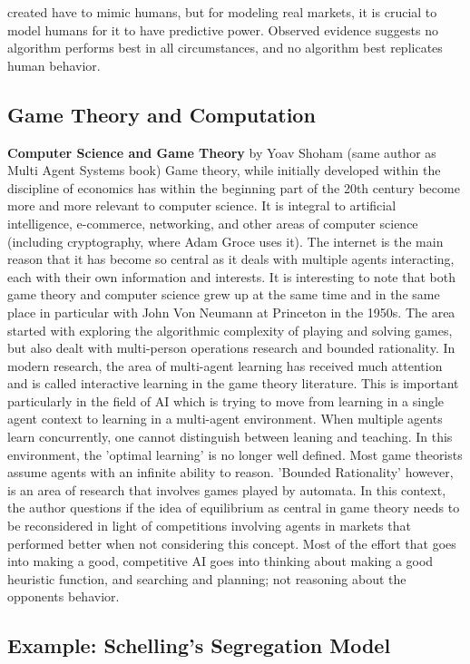 \documentclass[12pt,twoside]{reedthesis}
\begin{document}
created have to mimic humans, but for modeling real markets, it is crucial to model humans for it to have predictive power. Observed evidence suggests no algorithm performs best in all circumstances, and no algorithm best replicates human behavior. \cite{Tesfatsion2002}

\subsection{Game Theory and Computation}
\textbf{Computer Science and Game Theory} by Yoav Shoham (same author as Multi Agent Systems book) Game theory, while initially developed within the discipline of economics has within the beginning part of the 20th century become more and more relevant to computer science. It is integral to artificial intelligence, e-commerce, networking, and other areas of computer science (including cryptography, where Adam Groce uses it). The internet is the main reason that it has become so central as it deals with multiple agents interacting, each with their own information and interests. It is interesting to note that both game theory and computer science grew up at the same time and in the same place in particular with John Von Neumann at Princeton in the 1950s. The area started with exploring the algorithmic complexity of playing and solving games, but also dealt with multi-person operations research and bounded rationality. In modern research, the area of multi-agent learning has received much attention and is called interactive learning in the game theory literature. This is important particularly in the field of AI which is trying to move from learning in a single agent context to learning in a multi-agent environment. When multiple agents learn concurrently, one cannot distinguish between leaning and teaching. In this environment, the 'optimal learning' is no longer well defined. Most game theorists assume agents with an infinite ability to reason. 'Bounded Rationality' however, is an area of research that involves games played by automata. In this context, the author questions if the idea of equilibrium as central in game theory needs to be reconsidered in light of competitions involving agents in markets that performed better when not considering this concept. Most of the effort that goes into making a good, competitive AI goes into thinking about making a good heuristic function, and searching and planning; not reasoning about the opponents behavior. \cite{Shoham2008a}

\subsection{Example: Schelling's Segregation Model}
\end{document}
